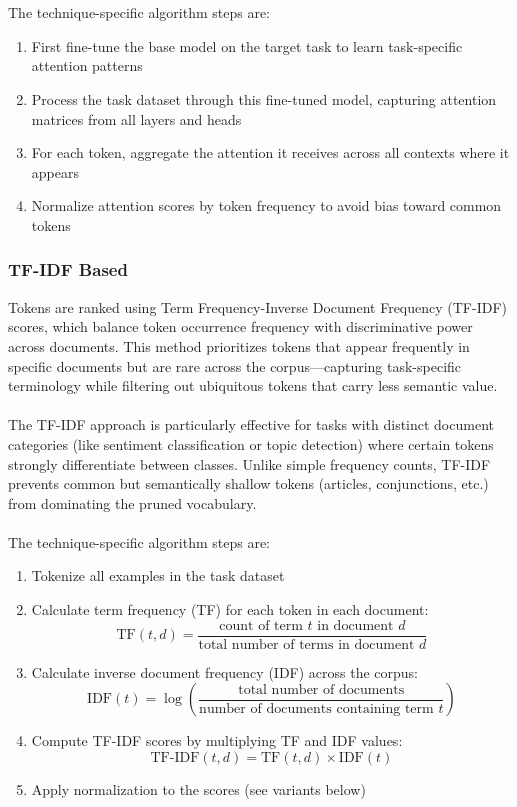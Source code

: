 \documentclass[twocolumn]{article}
\begin{document}
\\ \\
The technique-specific algorithm steps are:
\begin{enumerate}
    \item First fine-tune the base model on the target task to learn task-specific attention patterns
    \item Process the task dataset through this fine-tuned model, capturing attention matrices from all layers and heads
    \item For each token, aggregate the attention it receives across all contexts where it appears
    \item Normalize attention scores by token frequency to avoid bias toward common tokens
\end{enumerate}
\subsubsection{TF-IDF Based}
Tokens are ranked using Term Frequency-Inverse Document Frequency (TF-IDF) scores, which balance token occurrence frequency with discriminative power across documents. This method prioritizes tokens that appear frequently in specific documents but are rare across the corpus—capturing task-specific terminology while filtering out ubiquitous tokens that carry less semantic value.
\\ \\
The TF-IDF approach is particularly effective for tasks with distinct document categories (like sentiment classification or topic detection) where certain tokens strongly differentiate between classes. Unlike simple frequency counts, TF-IDF prevents common but semantically shallow tokens (articles, conjunctions, etc.) from dominating the pruned vocabulary.
\\ \\
The technique-specific algorithm steps are:
\begin{enumerate}
    \item Tokenize all examples in the task dataset
    \item Calculate term frequency (TF) for each token in each document:
        \begin{equation}
        \text{TF}(t,d) = \frac{\text{count of term $t$ in document $d$}}{\text{total number of terms in document $d$}}
        \end{equation}
    \item Calculate inverse document frequency (IDF) across the corpus:
        \begin{equation}
        \text{IDF}(t) = \log\left(\frac{\text{total number of documents}}{\text{number of documents containing term $t$}}\right)
        \end{equation}
    \item Compute TF-IDF scores by multiplying TF and IDF values:
        \begin{equation}
        \text{TF-IDF}(t,d) = \text{TF}(t,d) \times \text{IDF}(t)
        \end{equation}
    \item Apply normalization to the scores (see variants below)
\end{enumerate}
\end{document}
